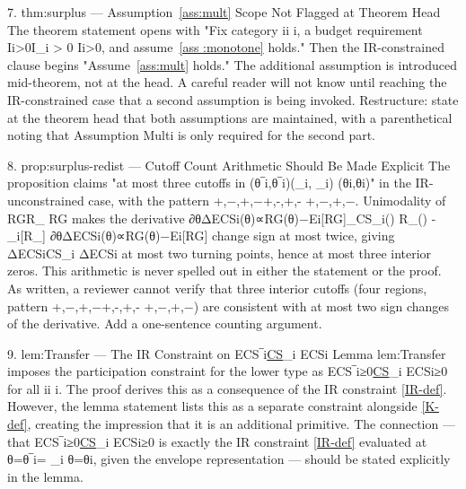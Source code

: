 7. thm:surplus — Assumption~\ref{ass:mult} Scope Not Flagged at Theorem Head
The theorem statement opens with "Fix category ii
i, a budget requirement Ii>0I_i > 0
Ii​>0, and assume~\ref{ass
:monotone} holds." Then the IR-constrained clause begins "Assume~\ref{ass:mult} holds." The additional assumption is introduced mid-theorem, not at the head. A careful reader will not know until reaching the IR-constrained case that a second assumption is being invoked. Restructure: state at the theorem head that both assumptions are maintained, with a parenthetical noting that Assumption Multi is only required for the second part.

8. prop:surplus-redist — Cutoff Count Arithmetic Should Be Made Explicit
The proposition claims "at most three cutoffs in (θ‾i,θ‾i)(\underline\theta_i, \overline\theta_i)
(θ​i​,θi​)" in the IR-unconstrained case, with the pattern +,−,+,−+,-,+,-
+,−,+,−. Unimodality of RGR_
RG​ makes the derivative ∂θΔECSi(θ)∝RG(θ)−Ei[RG]\partial_\theta\Delta{}CS_i(\theta) \propto R_(\theta) - _i[R_]
∂θ​ΔECSi​(θ)∝RG​(θ)−Ei​[RG​] change sign at most twice, giving ΔECSi\Delta{}CS_i
ΔECSi​ at most two turning points, hence at most three interior zeros. This arithmetic is never spelled out in either the statement or the proof. As written, a reviewer cannot verify that three interior cutoffs (four regions, pattern +,−,+,−+,-,+,-
+,−,+,−) are consistent with at most two sign changes of the derivative. Add a one-sentence counting argument.


9. lem:Transfer — The IR Constraint on ECS‾i\underline{CS}_i
ECS​i​
Lemma lem:Transfer imposes the participation constraint for the lower type as ECS‾i≥0\underline{CS}_i 
ECS​i​≥0 for all ii
i. The proof derives this as a consequence of the IR constraint \eqref{IR-def}. However, the lemma statement lists this as a separate constraint alongside \eqref{K-def}, creating the impression that it is an additional primitive. The connection — that ECS‾i≥0\underline{CS}_i 
ECS​i​≥0 is exactly the IR constraint \eqref{IR-def} evaluated at θ=θ‾i\theta = \underline\theta_i
θ=θ​i​, given the envelope representation — should be stated explicitly in the lemma.



